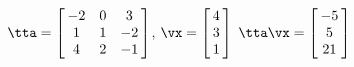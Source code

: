 {$\tta = \left[\hskip -3pt \begin{array}{ccc} -2&0&3\\  1&1&-2
\\  4&2&-1\end{array}\hskip -3pt \right]$,\quad  
$\vx = \left[\hskip -3pt \begin{array}{c} 4\\  3\\  
1\end{array}\hskip -3pt \right] $}
{$\tta\vx= \left[\hskip -3pt \begin{array}{c} -5\\  5\\  
21\end{array}\hskip -3pt \right] $
}
 
 

 

 

